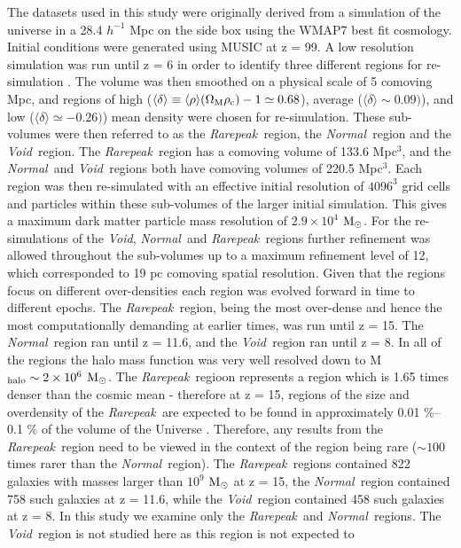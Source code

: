 \documentclass[graphics, twocolumn, usenatbib]{mn2e}
\newcommand{\mpch} {\rm $h^{-1}$ Mpc\,\,}
\newcommand{\msolar} {$\rm{M_{\odot}}~$}
\newcommand{\msolarc} {$\rm{M_{\odot}}$}
\newcommand{\rarepeak} {\textit{Rarepeak~}}
\newcommand{\normal} {\textit{Normal~}}
\newcommand{\void} {\textit{Void~}}
\newcommand{\voidc} {\textit{Void}}
\begin{document}
The datasets used in this study were originally derived from a simulation of the universe in a 28.4
\mpch on the side box using the WMAP7 best fit cosmology. Initial conditions were generated using
MUSIC \citep{Hahn_2011} at z = 99. A low resolution simulation was run until z = 6 in order to
identify three different regions for re-simulation \citep{Chen_2014}. The volume was then smoothed
on a physical scale of 5 comoving Mpc, and regions of high
($\langle\delta\rangle \equiv \langle\rho\rangle(\Omega_{\rm M} \rho_{\rm c}) - 1 \simeq 0.68$),
average ($\langle\delta\rangle \sim 0.09)$), and low ($\langle\delta\rangle \simeq -0.26)$)
mean density were chosen for re-simulation. These sub-volumes were then referred to as the
\rarepeak region, the \normal region  and the \void region. The \rarepeak region has a comoving
volume of 133.6 Mpc$^3$, and the \normal and \void regions both have comoving volumes of 220.5
Mpc$^3$. Each region was then re-simulated with an effective initial resolution of $4096^3$ grid
cells and particles within these sub-volumes of the larger initial simulation. This gives a maximum
dark matter particle mass resolution of $2.9 \times 10^4$ \msolarc. For the re-simulations of the
\voidc, \normal and \rarepeak regions further refinement was allowed throughout the sub-volumes up
to a maximum refinement level of 12, which corresponded to 19 pc comoving spatial resolution. Given
that the regions focus on different over-densities each region was evolved forward in time to
different epochs. The \rarepeak region, being the most over-dense and hence the most
computationally demanding at earlier times, was run until z = 15. The \normal region ran until z =
11.6, and the \void region ran until z = 8. In all of the regions the halo mass function was very
well resolved down to M$_{\rm halo} \sim 2 \times 10^6$ \msolarc. The \rarepeak regioon represents a
region which is 1.65 times denser than the cosmic mean - therefore at z = 15, regions of the
size and overdensity of the \rarepeak are expected to be found in approximately 0.01 \%–0.1 \%
of the volume of the Universe \citep{Wise_2019}. Therefore, any results from the
\rarepeak region need to be viewed in the context of the region being rare ($\sim 100$ times
rarer than the \normal region).
The \rarepeak regions contained
822 galaxies with masses larger than $10^9$ \msolar at z = 15, the \normal region contained 758
such galaxies at z = 11.6, while the \void region contained 458 such galaxies at z = 8.
In this study we examine only the \rarepeak and \normal regions. The 
\void region is not studied here as this region is not expected to 
\end{document}
